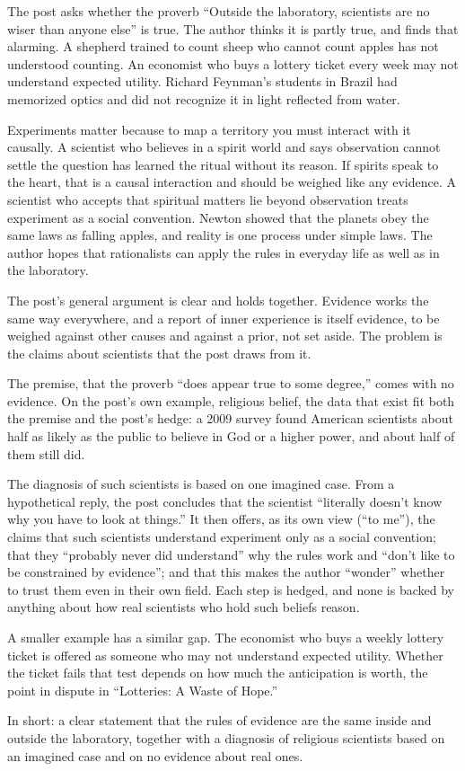 \begin{afterword}
\summaryhead

The post asks whether the proverb ``Outside the laboratory, scientists are no wiser than anyone else'' is true. The author thinks it is partly true, and finds that alarming. A shepherd trained to count sheep who cannot count apples has not understood counting. An economist who buys a lottery ticket every week may not understand expected utility. Richard Feynman's students in Brazil had memorized optics and did not recognize it in light reflected from water.

Experiments matter because to map a territory you must interact with it causally. A scientist who believes in a spirit world and says observation cannot settle the question has learned the ritual without its reason. If spirits speak to the heart, that is a causal interaction and should be weighed like any evidence. A scientist who accepts that spiritual matters lie beyond observation treats experiment as a social convention. Newton showed that the planets obey the same laws as falling apples, and reality is one process under simple laws. The author hopes that rationalists can apply the rules in everyday life as well as in the laboratory.

\responsehead

The post's general argument is clear and holds together. Evidence works the same way everywhere, and a report of inner experience is itself evidence, to be weighed against other causes and against a prior, not set aside. The problem is the claims about scientists that the post draws from it.

The premise, that the proverb ``does appear true to some degree,'' comes with no evidence. On the post's own example, religious belief, the data that exist fit both the premise and the post's hedge: a 2009 survey found American scientists about half as likely as the public to believe in God or a higher power, and about half of them still did.

The diagnosis of such scientists is based on one imagined case. From a hypothetical reply, the post concludes that the scientist ``literally doesn't know why you have to look at things.'' It then offers, as its own view (``to me''), the claims that such scientists understand experiment only as a social convention; that they ``probably never did understand'' why the rules work and ``don't like to be constrained by evidence''; and that this makes the author ``wonder'' whether to trust them even in their own field. Each step is hedged, and none is backed by anything about how real scientists who hold such beliefs reason.

A smaller example has a similar gap. The economist who buys a weekly lottery ticket is offered as someone who may not understand expected utility. Whether the ticket fails that test depends on how much the anticipation is worth, the point in dispute in ``Lotteries: A Waste of Hope.''

In short: a clear statement that the rules of evidence are the same inside and outside the laboratory, together with a diagnosis of religious scientists based on an imagined case and on no evidence about real ones.
\end{afterword}
